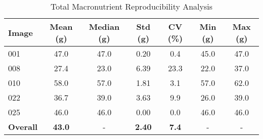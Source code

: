 \begin{table}[htbp]
\centering
\caption{Total Macronutrient Reproducibility Analysis}
\label{tab:total_macronutrient_reproducibility}
\begin{tabular}{lcccccc}
\toprule
Image & Mean (g) & Median (g) & Std (g) & CV (\%) & Min (g) & Max (g) \\
\midrule
001 & 47.0 & 47.0 & 0.20 & 0.4 & 45.0 & 47.0 \\
008 & 27.4 & 23.0 & 6.39 & 23.3 & 22.0 & 37.0 \\
010 & 58.0 & 57.0 & 1.81 & 3.1 & 57.0 & 62.0 \\
022 & 36.7 & 39.0 & 3.63 & 9.9 & 26.0 & 39.0 \\
025 & 46.0 & 46.0 & 0.00 & 0.0 & 46.0 & 46.0 \\
\midrule
\textbf{Overall} & \textbf{43.0} & - & \textbf{2.40} & \textbf{7.4} & - & - \\
\bottomrule
\end{tabular}
\end{table}